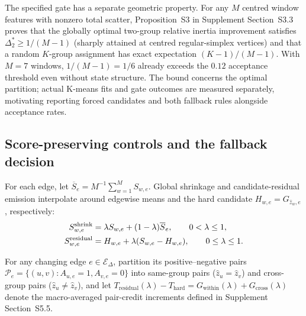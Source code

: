 \documentclass[11pt]{article}
\begin{document}
The specified gate has a separate geometric property. For any $M$ centred
window features with nonzero total scatter, Proposition~S3 in Supplement
Section~S3.3 proves that the globally optimal two-group relative inertia
improvement satisfies $\Delta_2^{*}\ge 1/(M-1)$ (sharply attained at centred
regular-simplex vertices) and that a random $K$-group assignment has exact
expectation $(K-1)/(M-1)$. With $M=7$ windows, $1/(M-1)=1/6$ already exceeds
the $0.12$ acceptance threshold even without state structure. The bound
concerns the optimal partition; actual K-means fits and gate outcomes are
measured separately, motivating reporting forced candidates and both fallback
rules alongside acceptance rates.

\subsection{Score-preserving controls and the fallback decision}
\label{sec:score-controls}
\begin{samepage}
For each edge, let $\overline S_e=M^{-1}\sum_{w=1}^{M} S_{w,e}$. Global shrinkage
and candidate-residual emission interpolate around edgewise means and the hard
candidate $H_{w,e}=G_{\widehat z_w,e}$, respectively:
\begin{align}
S^{\rm shrink}_{w,e}&=\lambda S_{w,e}+(1-\lambda)\overline S_e,
\qquad 0<\lambda\leq1,
\label{eq:score-shrink}\\
S^{\rm residual}_{w,e}&=H_{w,e}+\lambda(S_{w,e}-H_{w,e}),
\qquad 0\leq\lambda\leq1.
\label{eq:score-residual}
\end{align}
\par
\end{samepage}
For any changing edge $e\in\mathcal E_\Delta$, partition its positive--negative
pairs $\mathcal P_e=\{(u,v):A_{u,e}=1,A_{v,e}=0\}$ into same-group pairs
($\widehat z_u=\widehat z_v$) and cross-group pairs ($\widehat z_u\neq\widehat z_v$),
and let $T_{\mathrm{residual}}(\lambda)-T_{\mathrm{hard}}=G_{\mathrm{within}}(\lambda)+G_{\mathrm{cross}}(\lambda)$
denote the macro-averaged pair-credit increments defined in Supplement
Section~S5.5.
\end{document}
